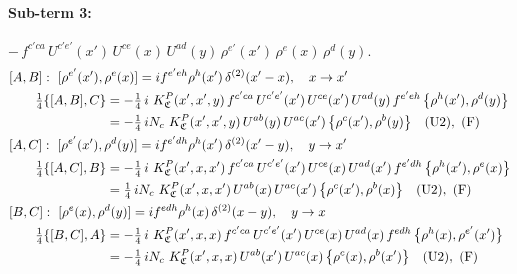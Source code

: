 \documentclass[10pt]{article}
\numberwithin{equation}{section}
\begin{document}
\paragraph{Sub-term 3:} $-\,f^{c'ca}\,U^{c'e'}(x')\,U^{ce}(x)\,U^{ad}(y)\,\rho^{e'}(x')\,\rho^{e}(x)\,\rho^{d}(y)$.
\begin{align}
&[A,B]:\ [\rho^{e'}(x'),\rho^{e}(x)]=i f^{e'eh}\rho^{h}(x')\,\delta^{(2)}(x'-x),\quad x\to x'\notag\\
&\qquad \tfrac14\{[A,B],C\}=-\tfrac14\,i\,\,K^{P}_{\mathfrak C}(x',x',y)\,f^{c'ca}\,U^{c'e'}(x')\,U^{ce}(x')\,U^{ad}(y)\,f^{e'eh}\,\big\{\rho^{h}(x'),\rho^{d}(y)\big\}\notag\\
&\qquad\phantom{\tfrac14\{[A,B],C\}}=-\tfrac14\,i N_{c}\,\,K^{P}_{\mathfrak C}(x',x',y)\,U^{ab}(y)\,U^{ac}(x')\,\big\{\rho^{c}(x'),\rho^{b}(y)\big\}\quad\text{(U2)},\ \text{(F)}
\label{eq:GIII.V.P-3-AB}\\
&[A,C]:\ [\rho^{e'}(x'),\rho^{d}(y)]=i f^{e'dh}\rho^{h}(x')\,\delta^{(2)}(x'-y),\quad y\to x'\notag\\
&\qquad \tfrac14\{[A,C],B\}=-\tfrac14\,i\,\,K^{P}_{\mathfrak C}(x',x,x')\,f^{c'ca}\,U^{c'e'}(x')\,U^{ce}(x)\,U^{ad}(x')\,f^{e'dh}\,\big\{\rho^{h}(x'),\rho^{e}(x)\big\}\notag\\
&\qquad\phantom{\tfrac14\{[A,C],B\}}=\tfrac14\,i N_{c}\,\,K^{P}_{\mathfrak C}(x',x,x')\,U^{ab}(x)\,U^{ac}(x')\,\big\{\rho^{c}(x'),\rho^{b}(x)\big\}\quad\text{(U2)},\ \text{(F)}
\label{eq:GIII.V.P-3-AC}\\
&[B,C]:\ [\rho^{e}(x),\rho^{d}(y)]=i f^{edh}\rho^{h}(x)\,\delta^{(2)}(x-y),\quad y\to x\notag\\
&\qquad \tfrac14\{[B,C],A\}=-\tfrac14\,i\,\,K^{P}_{\mathfrak C}(x',x,x)\,f^{c'ca}\,U^{c'e'}(x')\,U^{ce}(x)\,U^{ad}(x)\,f^{edh}\,\big\{\rho^{h}(x),\rho^{e'}(x')\big\}\notag\\
&\qquad\phantom{\tfrac14\{[B,C],A\}}=-\tfrac14\,i N_{c}\,\,K^{P}_{\mathfrak C}(x',x,x)\,U^{ab}(x')\,U^{ac}(x)\,\big\{\rho^{c}(x),\rho^{b}(x')\big\}\quad\text{(U2)},\ \text{(F)}
\label{eq:GIII.V.P-3-BC}
\end{align}
\end{document}
